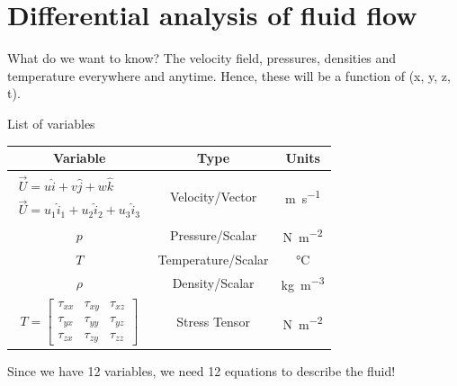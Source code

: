 \documentclass[class=report, crop=false, 12pt,a4paper]{standalone}
\begin{document}
\section{Differential analysis of fluid flow}
What do we want to know? The velocity field, pressures, densities and temperature everywhere and anytime. Hence, these will be a function of (x, y, z, t).

List of variables
\begin{center}
  \begin{tabular}{||c c c||} 
  \hline
  Variable & Type & Units \\ [0.5ex] 
  \hline\hline
  $\begin{matrix}
    \overrightarrow{U} = u \hat{i} + v\hat{j} + w\hat{k}\\
    \overrightarrow{U} = u_1 \hat{i}_1 + u_2 \hat{i}_2 + u_3 \hat{i}_3
  \end{matrix}$ & Velocity/Vector & \si{\m\per\s}\\ 
  \hline
  $p$ & Pressure/Scalar & \si{\newton\per\meter\squared} \\
  \hline
  $T$ & Temperature/Scalar & \si{\celsius} \\
  \hline
  $\rho$ & Density/Scalar & \si{\kg\per\meter\cubed} \\
  \hline
  $T = \begin{bmatrix}
    \tau_{xx} & \tau_{xy} & \tau_{xz}\\
    \tau_{yx} & \tau_{yy} & \tau_{yz}\\
    \tau_{zx} & \tau_{zy} & \tau_{zz}
  \end{bmatrix}$ & Stress Tensor & \si{\newton\per\meter\squared} \\ [1ex] 
  \hline
 \end{tabular}
\end{center}
Since we have 12 variables, we need 12 equations to describe the fluid!
\end{document}
